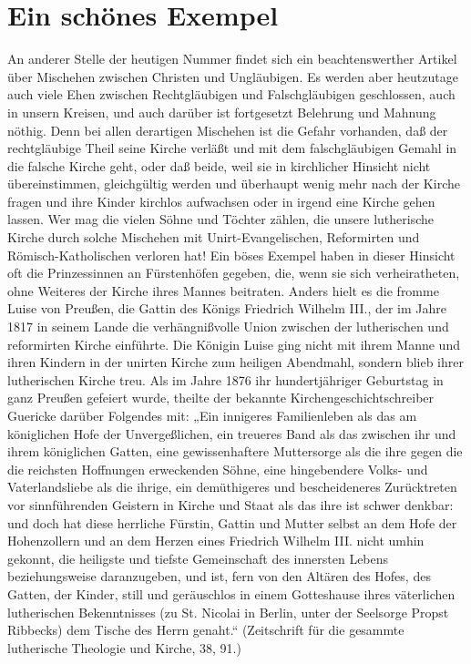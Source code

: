 \chapter{Ein schönes Exempel}

An anderer Stelle der heutigen Nummer findet sich ein beachtenswerther Artikel über Mischehen zwischen Christen und Ungläubigen. Es werden aber heutzutage auch viele Ehen zwischen Rechtgläubigen und Falschgläubigen geschlossen, auch in unsern Kreisen, und auch darüber ist fortgesetzt Belehrung und Mahnung nöthig. Denn bei allen derartigen Mischehen ist die Gefahr vorhanden, daß der rechtgläubige Theil seine Kirche verläßt und mit dem falschgläubigen Gemahl in die falsche Kirche geht, oder daß beide, weil sie in kirchlicher Hinsicht nicht übereinstimmen, gleichgültig werden und überhaupt wenig mehr nach der Kirche fragen und ihre Kinder kirchlos aufwachsen oder in irgend eine Kirche gehen lassen. Wer mag die vielen Söhne und Töchter zählen, die unsere lutherische Kirche durch solche Mischehen mit Unirt-Evangelischen, Reformirten und Römisch-Katholischen verloren hat! Ein böses Exempel haben in dieser Hinsicht oft die Prinzessinnen an Fürstenhöfen gegeben, die, wenn sie sich verheiratheten, ohne Weiteres der Kirche ihres Mannes beitraten. Anders hielt es die fromme Luise von Preußen, die Gattin des Königs Friedrich Wilhelm III., der im Jahre 1817 in seinem Lande die verhängnißvolle Union zwischen der lutherischen und reformirten Kirche einführte. Die Königin Luise ging nicht mit ihrem Manne und ihren Kindern in der unirten Kirche zum heiligen Abendmahl, sondern blieb ihrer lutherischen Kirche treu. Als im Jahre 1876 ihr hundertjähriger Geburtstag in ganz Preußen gefeiert wurde, theilte der bekannte Kirchengeschichtschreiber Guericke darüber Folgendes mit: „Ein innigeres Familienleben als das am königlichen Hofe der Unvergeßlichen, ein treueres Band als das zwischen ihr und ihrem königlichen Gatten, eine gewissenhaftere Muttersorge als die ihre gegen die die reichsten Hoffnungen erweckenden Söhne, eine hingebendere Volks- und Vaterlandsliebe als die ihrige, ein demüthigeres und bescheideneres Zurücktreten vor sinnführenden Geistern in Kirche und Staat als das ihre ist schwer denkbar: und doch hat diese herrliche Fürstin, Gattin und Mutter selbst an dem Hofe der Hohenzollern und an dem Herzen eines Friedrich Wilhelm III. nicht umhin gekonnt, die heiligste und tiefste Gemeinschaft des innersten Lebens beziehungsweise daranzugeben, und ist, fern von den Altären des Hofes, des Gatten, der Kinder, still und geräuschlos in einem Gotteshause ihres väterlichen lutherischen Bekenntnisses (zu St. Nicolai in Berlin, unter der Seelsorge Propst Ribbecks) dem Tische des Herrn genaht.“ (Zeitschrift für die gesammte lutherische Theologie und Kirche, 38, 91.)

